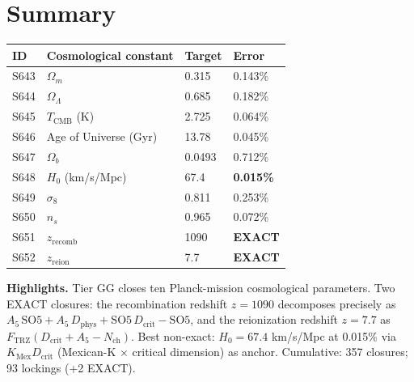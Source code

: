 \documentclass[11pt]{article}
\newcommand{\Ftrz}{F_{\mathrm{TRZ}}}
\newcommand{\KMex}{K_{\mathrm{Mex}}}
\newcommand{\Dphys}{D_{\mathrm{phys}}}
\newcommand{\Dcrit}{D_{\mathrm{crit}}}
\newcommand{\Nch}{N_{\mathrm{ch}}}
\newcommand{\SOfive}{\mathrm{SO5}}
\newcommand{\Afive}{A_5}
\begin{document}
\section*{Summary}
\begin{tabular}{llll}
\toprule
ID & Cosmological constant & Target & Error \\
\midrule
S643 & $\Omega_m$ & 0.315 & 0.143\% \\
S644 & $\Omega_\Lambda$ & 0.685 & 0.182\% \\
S645 & $T_{\mathrm{CMB}}$ (K) & 2.725 & 0.064\% \\
S646 & Age of Universe (Gyr) & 13.78 & 0.045\% \\
S647 & $\Omega_b$ & 0.0493 & 0.712\% \\
S648 & $H_0$ (km/s/Mpc) & 67.4 & \textbf{0.015\%} \\
S649 & $\sigma_8$ & 0.811 & 0.253\% \\
S650 & $n_s$ & 0.965 & 0.072\% \\
S651 & $z_{\mathrm{recomb}}$ & 1090 & \textbf{EXACT} \\
S652 & $z_{\mathrm{reion}}$ & 7.7 & \textbf{EXACT} \\
\bottomrule
\end{tabular}

\medskip
\textbf{Highlights.} Tier GG closes ten Planck-mission cosmological parameters. Two EXACT closures: the recombination redshift $z=1090$ decomposes precisely as $\Afive\,\SOfive + \Afive\,\Dphys + \SOfive\,\Dcrit - \SOfive$, and the reionization redshift $z=7.7$ as $\Ftrz(\Dcrit+\Afive-\Nch)$. Best non-exact: $H_0=67.4$ km/s/Mpc at 0.015\% via $\KMex\Dcrit$ (Mexican-K $\times$ critical dimension) as anchor. Cumulative: 357 closures; 93 lockings (+2 EXACT).
\end{document}
